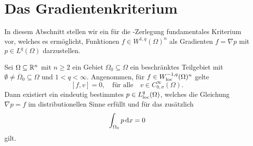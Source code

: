 \section{Das Gradientenkriterium}

In diesem Abschnitt stellen wir ein für die \helmholtz\hyp{}Zerlegung fundamentales Kriterium vor, welches es ermöglicht, Funktionen $f \in W^{1,q}(\Omega)^n$ als Gradienten $f = \nabla p$ mit $p \in L^q(\Omega)$ darzustellen.

\begin{lem}
  Sei $\Omega \subseteq \mathbb{R}^n$ mit $n \geq 2$ ein Gebiet $\Omega_0 \subseteq \Omega$ ein beschränktes Teilgebiet mit $\emptyset \neq \overline\Omega_0 \subseteq \Omega$ und $1 < q < \infty$.
  Angenommen, für $f \in W_{\operatorname{loc}}^{-1,q}(\Omega)^n$ gelte
  \begin{equation}
    \label{eq:vKernel}
    [f,v] = 0, \quad \text{für alle} \quad v \in C_{0,\sigma}^\infty(\Omega).
  \end{equation}
  Dann existiert ein eindeutig bestimmtes $p \in L^q_{\operatorname{loc}}(\Omega)$, welches die Gleichung $\nabla p = f$ im distributionellen Sinne erfüllt und für das zusätzlich
  \begin{equation}
    \int_{\Omega_0} p \, {\operatorname{d}\!{x}} = 0
    \label{eq:0integral}
  \end{equation}
  gilt.
\end{lem}

